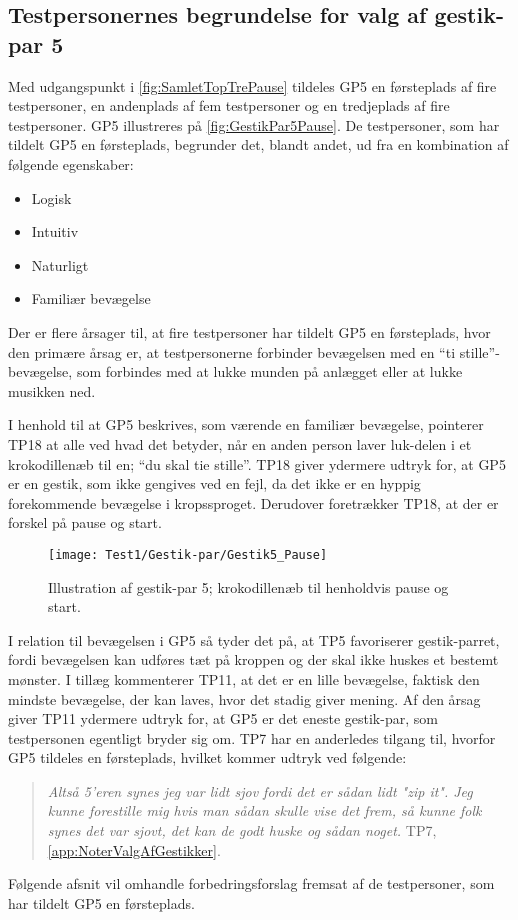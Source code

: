 \subsection{Testpersonernes begrundelse for valg af gestik-par 5}
\label{TestresultaterValgAfGestikkerBegrundelseGP5Pause}
%
Med udgangspunkt i \autoref{fig:SamletTopTrePause} tildeles GP5 en førsteplads af fire testpersoner, en andenplads af fem testpersoner og en tredjeplads af fire testpersoner. GP5 illustreres på \autoref{fig:GestikPar5Pause}. De testpersoner, som har tildelt GP5 en førsteplads, begrunder det, blandt andet, ud fra en kombination af følgende egenskaber: 
%
\begin{multicols}{3}
    \begin{itemize}
        \item Logisk
        \item Intuitiv
        \item Naturligt
        \item Familiær bevægelse
\end{itemize}
\end{multicols}
\noindent
%
Der er flere årsager til, at fire testpersoner har tildelt GP5 en førsteplads, hvor den primære årsag er, at testpersonerne forbinder bevægelsen med en \enquote{ti stille}-bevægelse, som forbindes med at lukke munden på anlægget eller at lukke musikken ned.

I henhold til at GP5 beskrives, som værende en familiær bevægelse, pointerer TP18 at alle ved hvad det betyder, når en anden person laver luk-delen i et krokodillenæb til en; \enquote{du skal tie stille}. TP18 giver ydermere udtryk for, at GP5 er en gestik, som ikke gengives ved en fejl, da det ikke er en hyppig forekommende bevægelse i kropssproget. Derudover foretrækker TP18, at der er forskel på pause og start. 
%
\begin{figure}[H]
	\centering
	\texttt{[image: Test1/Gestik-par/Gestik5\_Pause]}
	\caption{Illustration af gestik-par 5; krokodillenæb til henholdvis pause og start.}
	\label{fig:GestikPar5Pause}
\end{figure}
\noindent
%
I relation til bevægelsen i GP5 så tyder det på, at TP5 favoriserer gestik-parret, fordi bevægelsen kan udføres tæt på kroppen og der skal ikke huskes et bestemt mønster. I tillæg kommenterer TP11, at det er en lille bevægelse, faktisk den mindste bevægelse, der kan laves, hvor det stadig giver mening. Af den årsag giver TP11 ydermere udtryk for, at GP5 er det eneste gestik-par, som testpersonen egentligt bryder sig om. TP7 har en anderledes tilgang til, hvorfor GP5 tildeles en førsteplads, hvilket kommer udtryk ved følgende: 
%
\begin{quotation}
	\noindent
	\textit{Altså 5'eren synes jeg var lidt sjov fordi det er sådan lidt "zip it". Jeg kunne forestille mig hvis man sådan skulle vise det frem, så kunne folk synes det var sjovt, det kan de godt huske og sådan noget.} TP7, \autoref{app:NoterValgAfGestikker}.
\noindent
\end{quotation}
%
Følgende afsnit vil omhandle forbedringsforslag fremsat af de testpersoner, som har tildelt GP5 en førsteplads.
%
